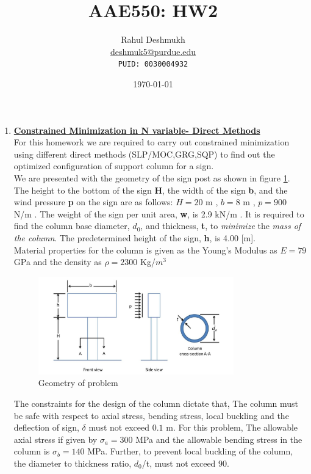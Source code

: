 \documentclass[12pt]{article}
\title{AAE550: HW2}
\author{Rahul Deshmukh \\\href{mailto:deshmuk5@purdue.edu}{{\color{blue}deshmuk5@purdue.edu}} \\\texttt{PUID: 0030004932}}
\date{\today}
\begin{document}
\maketitle
\begin{enumerate}[I]
\item \underline{\textbf{Constrained Minimization in N variable- Direct Methods}}\\
For this homework we are required to carry out constrained minimization using different direct methods (SLP/MOC,GRG,SQP) to find out the optimized configuration of support column for a sign.\\

We are presented with the geometry of the sign post as shown in figure \ref{fig:main_fig}. The height to the bottom of the sign \textbf{H}, the width of the sign \textbf{b}, and the wind pressure \textbf{p} on the sign are as follows: $H= 20$ m , $b=8$ m , $p=900$ N/m . The weight of the sign per unit area, \textbf{w}, is 2.9 kN/m . It is required to find the column base diameter, \textbf{$d_0$}, and thickness, \textbf{t}, to \textit{minimize} the \textit{mass of the column}. The predetermined height of the sign, \textbf{h}, is 4.00 [m].\\

Material properties for the column is given as the Young's Modulus as $E=79$ GPa and the density as $\rho=2300$ Kg/$m^3$
\begin{figure}[!h]
  \centering
    \includegraphics[width=0.8\textwidth]{problem_fig.JPG}
    \caption{Geometry of problem}
  \label{fig:main_fig}
\end{figure}

The constraints for the design of the column dictate that, The column must be safe with respect to axial stress, bending stress, local buckling and the deflection of sign, $\delta$ must not exceed $0.1$ m. For this problem, The allowable axial stress if given by $\sigma_a=300$ MPa and the allowable bending stress in the column is $\sigma_{b}=140 $ MPa. Further, to prevent local buckling of the column, the diameter to thickness ratio, $d_0$/t, must not exceed $90$.\\


\end{enumerate}
\end{document}
